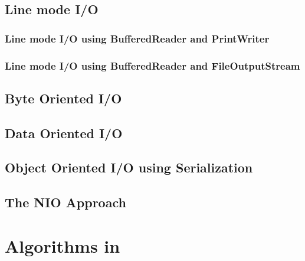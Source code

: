 \section{Line mode I/O}
\subsection{Line mode I/O using BufferedReader and PrintWriter}
\subsection{Line mode I/O using BufferedReader and FileOutputStream}

\section{Byte Oriented I/O}
\section{Data Oriented I/O}
\section{Object Oriented I/O using Serialization}
\section{The NIO Approach}
\chapter{Algorithms in \nr}{}
